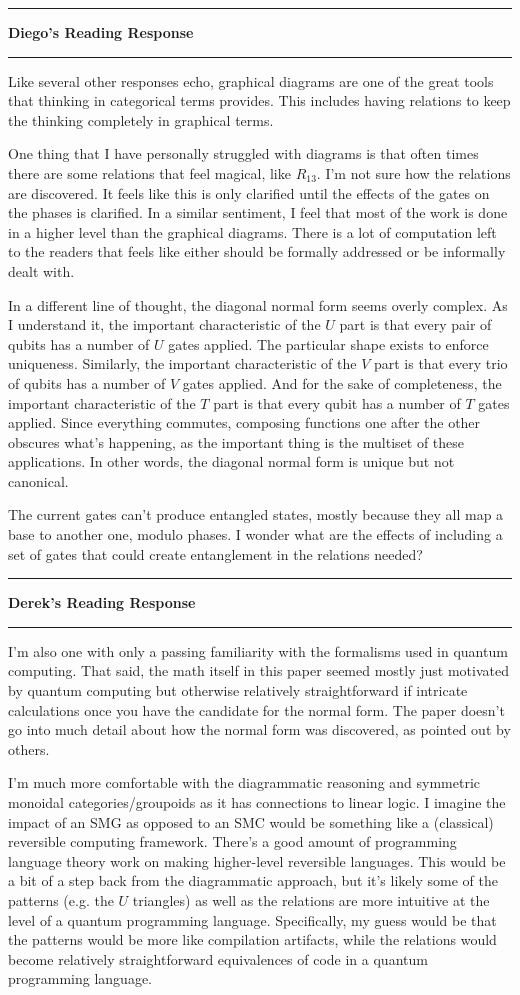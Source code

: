 \documentclass{amsart}
\newcommand{\iam}[1]{
  \vspace{0.25em}
  \hrule
  \vspace{0.25em}
  \textbf{{#1}'s Reading Response}
  \vspace{0.25em}
  \hrule
  \vspace{1em}
}
\begin{document}
\iam{Diego}

Like several other responses echo, graphical diagrams are one of the great tools that
thinking in categorical terms provides. This includes having relations to keep
the thinking completely in graphical terms.

One thing that I have personally struggled with diagrams is that often times there are
some relations that feel magical, like $R_{13}$. I'm not sure how the relations are
discovered. It feels like this is only clarified until
the effects of the gates on the phases is clarified.
In a similar sentiment, I feel that most of the work is done in a higher level than
the graphical diagrams. There is a lot of computation left to the readers that feels like either should
be formally addressed or be informally dealt with.

In a different line of thought,
the diagonal normal form seems overly complex. As I understand it, the important characteristic
of the $U$ part is that every pair of qubits has a number of $U$ gates applied. The particular
shape exists to enforce uniqueness. Similarly, the important
characteristic of the $V$ part is that every trio of qubits has a number of $V$ gates applied.
And for the sake of completeness, the important characteristic of the $T$ part is that
every qubit has a number of $T$ gates applied. Since everything commutes, composing functions
one after the other obscures what's happening, as the important thing is the multiset of these
applications. In other words, the diagonal normal form is unique but not canonical.

The current gates can't produce entangled states, mostly because they all map a base
to another one, modulo phases. I wonder what are the effects of including a set of gates
that could create entanglement in the relations needed?

\iam{Derek}

I'm also one with only a passing familiarity with the formalisms used in quantum computing. That said,
the math itself in this paper seemed mostly just motivated by quantum computing but otherwise relatively straightforward
if intricate calculations once you have the candidate for the normal form. The paper doesn't go into much
detail about how the normal form was discovered, as pointed out by others.

I'm much more comfortable with the diagrammatic reasoning and symmetric monoidal categories/groupoids as it
has connections to linear logic. I imagine the impact of an SMG as opposed to an SMC would be something like
a (classical) reversible computing framework. There's a good amount of programming language theory work on
making higher-level reversible languages. This would be a bit of a step back from the diagrammatic approach,
but it's likely some of the patterns (e.g. the $U$ triangles) as well as the relations are more intuitive at
the level of a quantum programming language. Specifically, my guess would be that the patterns would be more
like compilation artifacts, while the relations would become relatively straightforward equivalences of code
in a quantum programming language.
\end{document}
